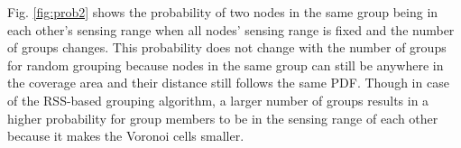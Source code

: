 Fig. \ref{fig:prob2} shows the probability of two nodes in the same group being in each other's sensing range when all nodes' sensing range is fixed and the number of groups changes. This probability does not change with the number of groups for random grouping because nodes in the same group can still be anywhere in the coverage area and their distance still follows the same PDF. Though in case of the RSS-based grouping algorithm, a larger number of groups results in a higher probability for group members to be in the sensing range of each other because it makes the Voronoi cells smaller.    

